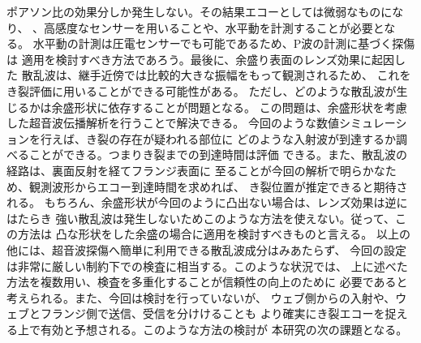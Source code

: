 ポアソン比の効果分しか発生しない。その結果エコーとしては微弱なものになり、
、高感度なセンサーを用いることや、水平動を計測することが必要となる。
水平動の計測は圧電センサーでも可能であるため、P波の計測に基づく探傷は
適用を検討すべき方法であろう。最後に、余盛り表面のレンズ効果に起因した
散乱波は、継手近傍では比較的大きな振幅をもって観測されるため、
これをき裂評価に用いることができる可能性がある。
ただし、どのような散乱波が生じるかは余盛形状に依存することが問題となる。
この問題は、余盛形状を考慮した超音波伝播解析を行うことで解決できる。
今回のような数値シミュレーションを行えば、き裂の存在が疑われる部位に
どのような入射波が到達するか調べることができる。つまりき裂までの到達時間は評価
できる。また、散乱波の経路は、裏面反射を経てフランジ表面に
至ることが今回の解析で明らかなため、観測波形からエコー到達時間を求めれば、
き裂位置が推定できると期待される。
もちろん、余盛形状が今回のように凸出ない場合は、レンズ効果は逆にはたらき
強い散乱波は発生しないためこのような方法を使えない。従って、この方法は
凸な形状をした余盛の場合に適用を検討すべきものと言える。
以上の他には、超音波探傷へ簡単に利用できる散乱波成分はみあたらず、
今回の設定は非常に厳しい制約下での検査に相当する。このような状況では、
上に述べた方法を複数用い、検査を多重化することが信頼性の向上のために
必要であると考えられる。また、今回は検討を行っていないが、
ウェブ側からの入射や、ウェブとフランジ側で送信、受信を分けけることも
より確実にき裂エコーを捉える上で有効と予想される。このような方法の検討が
本研究の次の課題となる。



